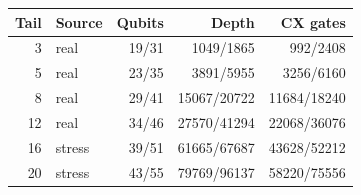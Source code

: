 \begin{tabular}{rlrrr}
\toprule
Tail & Source & Qubits & Depth & CX gates\\
\midrule
3 & real & 19/31 & 1049/1865 & 992/2408\\
5 & real & 23/35 & 3891/5955 & 3256/6160\\
8 & real & 29/41 & 15067/20722 & 11684/18240\\
12 & real & 34/46 & 27570/41294 & 22068/36076\\
16 & stress & 39/51 & 61665/67687 & 43628/52212\\
20 & stress & 43/55 & 79769/96137 & 58220/75556\\
\bottomrule
\end{tabular}
